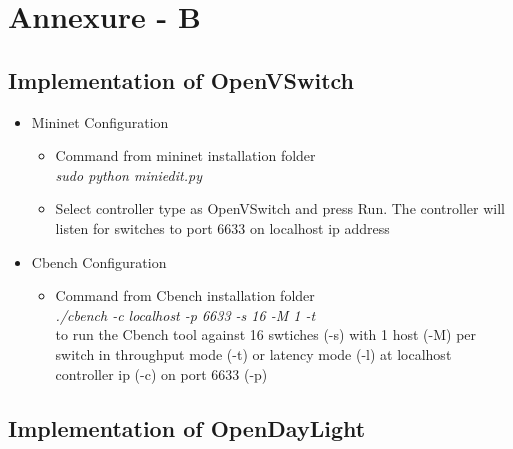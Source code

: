 \chapter*{Annexure - B}

\section*{Implementation of OpenVSwitch}

\begin{itemize}

    \item Mininet Configuration
        
    \begin{itemize}
    
        \item Command from mininet installation folder\\
        \emph{sudo python miniedit.py}
        
        \item Select controller type as OpenVSwitch and press Run. The controller will listen for switches to port 6633 on localhost ip address
            
    \end{itemize}
    
    \item Cbench Configuration
        
    \begin{itemize}
    
        \item Command from Cbench installation folder\\
        \emph{./cbench -c localhost -p 6633 -s 16 -M 1 -t}\\
        to run the Cbench tool against 16 swtiches (-s) with 1 host (-M) per switch in throughput mode (-t) or latency mode (-l)
        at localhost controller ip (-c) on port 6633 (-p) 
        
        
    \end{itemize}
    
\end{itemize}

\section*{Implementation of OpenDayLight}

